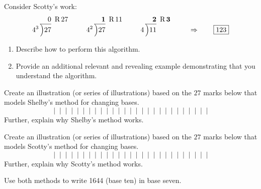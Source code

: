 \begin{prob} Consider Scotty's work:
\[
4^3\,\begin{tabular}[b]{@{}r@{} r}
$0$ &\, R\,$27$\\ \cline{1-1}
\Big)\begin{tabular}[t]{@{}l@{}}
$27$ 
\end{tabular}
\end{tabular}
\qquad
4^2\,\begin{tabular}[b]{@{}r@{} r}
$\boldsymbol{1}$ &\, R\,$11$\\ \cline{1-1}
\Big)\begin{tabular}[t]{@{}l@{}}
$27$ 
\end{tabular}
\end{tabular}
\qquad
4\,\begin{tabular}[b]{@{}r@{} r}
$\boldsymbol{2}$ &\, R\,$\boldsymbol{3}$\\ \cline{1-1}
\Big)\begin{tabular}[t]{@{}l@{}}
$11$ 
\end{tabular}
\end{tabular} \qquad \Rightarrow \qquad \fbox{$123$}
\]
\begin{enumerate}
\item Describe how to perform this algorithm.
\item Provide an additional relevant and revealing example
  demonstrating that you understand the algorithm.
\end{enumerate}
\end{prob}

\begin{prob} 
Create an illustration (or series of illustrations) based on the $27$
marks below that models Shelby's method for changing bases.
\[
|\;\;|\;\;|\;\;|\;\;|\;\;|\;\;|\;\;|\;\;|\;\;|\;\;|\;\;|\;\;|\;\;|\;\;|\;\;|\;\;|\;\;|\;\;|\;\;|\;\;|\;\;|\;\;|\;\;|\;\;|\;\;|\;\;|
\]
Further, explain why Shelby's method works. 
\end{prob}

\begin{prob} 
Create an illustration (or series of illustrations) based on the $27$
marks below that models Scotty's method for changing bases.
\[
|\;\;|\;\;|\;\;|\;\;|\;\;|\;\;|\;\;|\;\;|\;\;|\;\;|\;\;|\;\;|\;\;|\;\;|\;\;|\;\;|\;\;|\;\;|\;\;|\;\;|\;\;|\;\;|\;\;|\;\;|\;\;|\;\;|
\]
Further, explain why Scotty's method works. 
\end{prob}

\begin{prob}
Use both methods to write 1644 (base ten) in base seven.
\end{prob}


